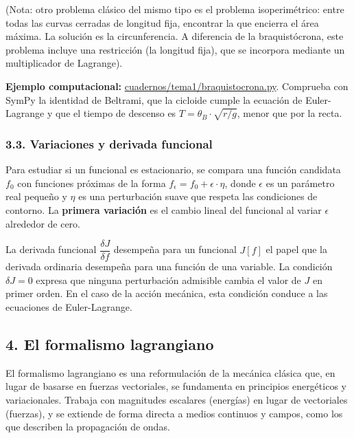 \documentclass[
  spanish,
]{article}
\begin{document}
(Nota: otro problema clásico del mismo tipo es el problema
isoperimétrico: entre todas las curvas cerradas de longitud fija,
encontrar la que encierra el área máxima. La solución es la
circunferencia. A diferencia de la braquistócrona, este problema incluye
una restricción (la longitud fija), que se incorpora mediante un
multiplicador de Lagrange).

\textbf{Ejemplo computacional:}
\href{https://github.com/julian1c2a/MCC/blob/main/cuadernos/tema1/braquistocrona.py}{cuadernos/tema1/braquistocrona.py}.
Comprueba con SymPy la identidad de Beltrami, que la cicloide cumple la
ecuación de Euler-Lagrange y que el tiempo de descenso es
\(T = \theta_B \cdot \sqrt{r/g}\), menor que por la recta.

\subsubsection{3.3. Variaciones y derivada
funcional}\label{variaciones-y-derivada-funcional}

Para estudiar si un funcional es estacionario, se compara una función
candidata \(f_0\) con funciones próximas de la forma
\(f_\epsilon = f_0 + \epsilon \cdot \eta\), donde \(\epsilon\) es un
parámetro real pequeño y \(\eta\) es una perturbación suave que respeta
las condiciones de contorno. La \textbf{primera variación} es el cambio
lineal del funcional al variar \(\epsilon\) alrededor de cero.

La derivada funcional \(\dfrac{\delta J}{\delta f}\) desempeña para un
funcional \(J[f]\) el papel que la derivada ordinaria desempeña para una
función de una variable. La condición \(\delta J = 0\) expresa que
ninguna perturbación admisible cambia el valor de \(J\) en primer orden.
En el caso de la acción mecánica, esta condición conduce a las
ecuaciones de Euler-Lagrange.

\subsection{4. El formalismo
lagrangiano}\label{el-formalismo-lagrangiano}

El formalismo lagrangiano es una reformulación de la mecánica clásica
que, en lugar de basarse en fuerzas vectoriales, se fundamenta en
principios energéticos y variacionales. Trabaja con magnitudes escalares
(energías) en lugar de vectoriales (fuerzas), y se extiende de forma
directa a medios continuos y campos, como los que describen la
propagación de ondas.
\end{document}
